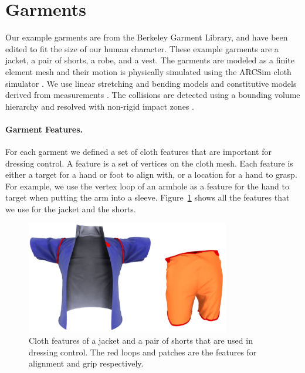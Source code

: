 \section{Garments}


Our example garments are from the Berkeley Garment Library, and have been
edited to fit the size of our human character.  These example garments
are a jacket, a pair of shorts, a robe, and a vest.
The garments are modeled as a finite element mesh and their motion is
physically simulated
using the ARCSim cloth simulator \cite{Narain:2012:AAR}. We use linear
stretching and bending models and constitutive models derived from
measurements \cite{Wang:2011}. The collisions are detected using a
bounding volume hierarchy \cite{Tang:2010} and resolved with non-rigid
impact zones \cite{Harmon:2008}.

\paragraph{Garment Features.} For each garment we defined a set of cloth
features that are important for dressing control. A feature is a set of
vertices on the cloth mesh.  Each feature is either a target for a hand or
foot to align with, or a location for a hand to grasp.  For example, we
use the vertex loop of an armhole as a feature for the hand to target when
putting the arm into a sleeve.  Figure~\ref{fig:features} shows all the
features that we use for the jacket and the shorts.

\begin{figure}[!t]
  \centering
  \includegraphics[width=3.5in]{images/features}
  \caption{Cloth features of a jacket and a pair of shorts that are used in dressing control. The red loops and patches are the features for alignment and grip respectively.}
  \label{fig:features}
\end{figure}

